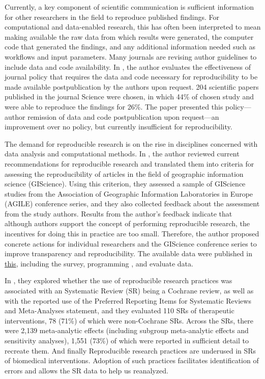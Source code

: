 \documentclass[
10pt, %
a4paper, %
oneside, %
headinclude,footinclude, %
BCOR5mm, %
]{scrartcl}
\begin{document}
Currently, a key component of scientific communication is sufficient information for other researchers in the field to reproduce published findings. For computational and data-enabled research, this has often been interpreted to mean making available the raw data from which results were generated, the computer code that generated the findings, and any additional information needed such as workflows and input parameters. Many journals are revising author guidelines to include data and code availability. In \cite{stodden2018empirical}, the author evaluates the effectiveness of journal policy that requires the data and code necessary for reproducibility to be made available postpublication by the authors upon request. 204 scientific papers published in the journal Science were chosen, in which 44\% of chosen study and were able to reproduce the findings for 26\%. The paper presented this policy—author remission of data and code postpublication upon request—an improvement over no policy, but currently insufficient for reproducibility.


The demand for reproducible research is on the rise in disciplines concerned with data analysis and computational methods. In \cite{nust2018reproducible}, the author reviewed current recommendations for reproducible research and translated them into criteria for assessing the reproducibility of articles in the field of geographic information science (GIScience). Using this criterion, they assessed a sample of GIScience studies from the Association of Geographic Information Laboratories in Europe (AGILE) conference series, and they also collected feedback about the assessment from the study authors. Results from the author's feedback indicate that although authors support the concept of performing reproducible research, the incentives for doing this in practice are too small. Therefore, the author proposed concrete actions for individual researchers and the GIScience conference series to improve transparency and reproducibility. The available data were published in \href{https://github.com/nuest/reproducible-research-and-giscience}{this}, including the survey, programming , and evaluate data.

In \cite{PAGE20188}, they explored whether the use of reproducible research practices was associated with an Systematic Review (SR) being a Cochrane review, as well as with the reported use of the Preferred Reporting Items for Systematic Reviews and Meta-Analyses statement, and they evaluated 110 SRs of therapeutic interventions, 78 (71\%) of which were non-Cochrane SRs. Across the SRs, there were 2,139 meta-analytic effects (including subgroup meta-analytic effects and sensitivity analyses), 1,551 (73\%) of which were reported in sufficient detail to recreate them. And finally Reproducible research practices are underused in SRs of biomedical interventions. Adoption of such practices facilitates identification of errors and allows the SR data to help us  reanalyzed.
\end{document}
